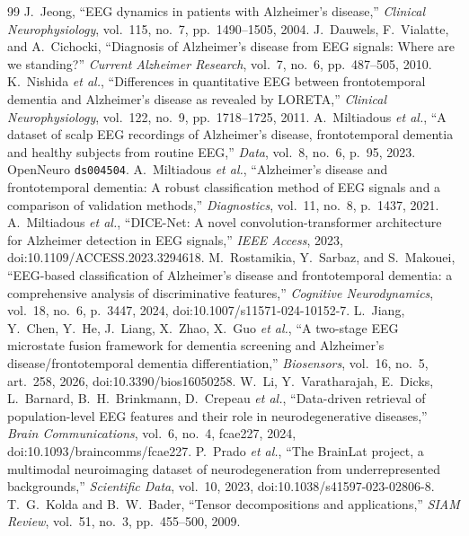\documentclass[10pt,twocolumn,a4paper]{article}
\newcommand{\code}[1]{\texttt{\small #1}}
\begin{document}
\begin{thebibliography}{99}\footnotesize\setlength{\itemsep}{0pt}
 J.~Jeong, ``EEG dynamics in patients with Alzheimer's disease,'' \emph{Clinical Neurophysiology}, vol.~115, no.~7, pp.~1490--1505, 2004.
 J.~Dauwels, F.~Vialatte, and A.~Cichocki, ``Diagnosis of Alzheimer's disease from EEG signals: Where are we standing?'' \emph{Current Alzheimer Research}, vol.~7, no.~6, pp.~487--505, 2010.
 K.~Nishida \emph{et al.}, ``Differences in quantitative EEG between frontotemporal dementia and Alzheimer's disease as revealed by LORETA,'' \emph{Clinical Neurophysiology}, vol.~122, no.~9, pp.~1718--1725, 2011.
 A.~Miltiadous \emph{et al.}, ``A dataset of scalp EEG recordings of Alzheimer's disease, frontotemporal dementia and healthy subjects from routine EEG,'' \emph{Data}, vol.~8, no.~6, p.~95, 2023. OpenNeuro \code{ds004504}.
 A.~Miltiadous \emph{et al.}, ``Alzheimer's disease and frontotemporal dementia: A robust classification method of EEG signals and a comparison of validation methods,'' \emph{Diagnostics}, vol.~11, no.~8, p.~1437, 2021.
 A.~Miltiadous \emph{et al.}, ``DICE-Net: A novel convolution-transformer architecture for Alzheimer detection in EEG signals,'' \emph{IEEE Access}, 2023, doi:10.1109/ACCESS.2023.3294618.
 M.~Rostamikia, Y.~Sarbaz, and S.~Makouei, ``EEG-based classification of Alzheimer's disease and frontotemporal dementia: a comprehensive analysis of discriminative features,'' \emph{Cognitive Neurodynamics}, vol.~18, no.~6, p.~3447, 2024, doi:10.1007/s11571-024-10152-7.
 L.~Jiang, Y.~Chen, Y.~He, J.~Liang, X.~Zhao, X.~Guo \emph{et al.}, ``A two-stage EEG microstate fusion framework for dementia screening and Alzheimer's disease/frontotemporal dementia differentiation,'' \emph{Biosensors}, vol.~16, no.~5, art.~258, 2026, doi:10.3390/bios16050258.
 W.~Li, Y.~Varatharajah, E.~Dicks, L.~Barnard, B.~H.~Brinkmann, D.~Crepeau \emph{et al.}, ``Data-driven retrieval of population-level EEG features and their role in neurodegenerative diseases,'' \emph{Brain Communications}, vol.~6, no.~4, fcae227, 2024, doi:10.1093/braincomms/fcae227.
 P.~Prado \emph{et al.}, ``The BrainLat project, a multimodal neuroimaging dataset of neurodegeneration from underrepresented backgrounds,'' \emph{Scientific Data}, vol.~10, 2023, doi:10.1038/s41597-023-02806-8.
 T.~G.~Kolda and B.~W.~Bader, ``Tensor decompositions and applications,'' \emph{SIAM Review}, vol.~51, no.~3, pp.~455--500, 2009.

\end{thebibliography}
\end{document}
